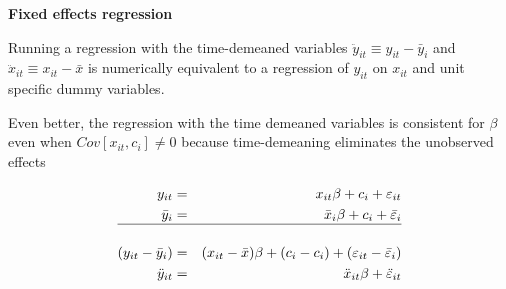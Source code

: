 \documentclass{beamer}
\begin{document}
\begin{frame}[plain]
	\begin{center}
	\textbf{Fixed effects regression}
	\end{center}
	
Running a regression with the time-demeaned variables $\ddot{y}_{it}\equiv y_{it} - \bar{y}_i$ and $\ddot{x}_{it} \equiv x_{it} - \bar{x}$ is numerically equivalent to a regression of $y_{it}$ on $x_{it}$ and unit specific dummy variables.

\vspace{10mm}

Even better, the regression with the time demeaned variables is consistent for $\beta$ even when $Cov[x_{it},c_i]\neq 0$ because time-demeaning eliminates the unobserved effects

\begin{eqnarray*}
y_{it} &=& x_{it}\beta + c_i + \varepsilon_{it} \\
\bar{y}_i &=& \bar{x}_i \beta + c_i + \bar{\varepsilon}_{i}\\
\hline \\
(y_{it} - \bar{y}_i) &=& (x_{it} - \bar{x})\beta + (c_i - c_i) + (\varepsilon_{it} - \bar{\varepsilon}_i) \\
\ddot{y}_{it} &=& \ddot{x}_{it}\beta + \ddot{\varepsilon}_{it}
\end{eqnarray*}

\end{frame}
\end{document}
